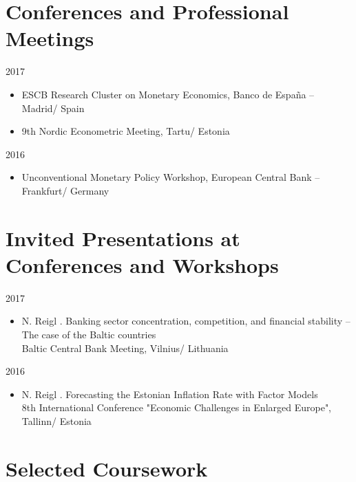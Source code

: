 \documentclass[11pt,letter,sans]{moderncv}
\begin{document}
\section{Conferences and Professional Meetings}

2017\begin{itemize}
  \item ESCB Research Cluster on Monetary Economics, Banco de España -- Madrid/ Spain
\end{itemize}\begin{itemize}
  \item 9th Nordic Econometric Meeting, Tartu/ Estonia
\end{itemize}2016\begin{itemize}
  \item Unconventional Monetary Policy Workshop, European Central Bank -- Frankfurt/ Germany
\end{itemize}


\section{Invited Presentations at Conferences and Workshops}

2017\begin{itemize}
  \item N. Reigl . Banking sector concentration, competition, and financial stability -- The case of the Baltic countries \\
  Baltic Central Bank Meeting, Vilnius/ Lithuania
\end{itemize}2016\begin{itemize}
  \item N. Reigl . Forecasting the Estonian Inflation Rate with Factor Models \\
  8th International Conference "Economic Challenges in Enlarged Europe", Tallinn/ Estonia
\end{itemize}


\section{Selected Coursework}
\end{document}
